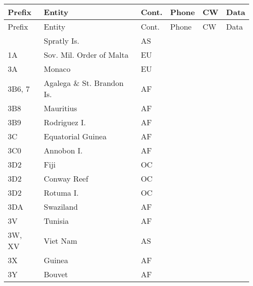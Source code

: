 \documentclass[a4paper]{article}
\begin{document}
\rhead{\call}

\renewcommand\arraystretch{2}
\raggedright
\begin{longtable}{|p{1.5cm}|p{4cm}|l|p{2cm}|p{2cm}|p{2cm}|}
\hline
Prefix & Entity & Cont. & Phone & CW & Data \\
\hline
\hline
\endfirsthead
\hline
Prefix & Entity & Cont. & Phone & CW & Data \\
\hline
\hline
\endhead
\hline
\endfoot
\hline
\endlastfoot
                       & Spratly Is.                                & AS    & & & \\
\hline
1A                     & Sov. Mil. Order of Malta                   & EU    & & & \\
\hline
3A                     & Monaco                                     & EU    & & & \\
\hline
3B6, 7                 & Agalega \& St. Brandon Is.                 & AF    & & & \\
\hline
3B8                    & Mauritius                                  & AF    & & & \\
\hline
3B9                    & Rodriguez I.                               & AF    & & & \\
\hline
3C                     & Equatorial Guinea                          & AF    & & & \\
\hline
3C0                    & Annobon I.                                 & AF    & & & \\
\hline
3D2                    & Fiji                                       & OC    & & & \\
\hline
3D2                    & Conway Reef                                & OC    & & & \\
\hline
3D2                    & Rotuma I.                                  & OC    & & & \\
\hline
3DA                    & Swaziland                                  & AF    & & & \\
\hline
3V                     & Tunisia                                    & AF    & & & \\
\hline
3W, XV                 & Viet Nam                                   & AS    & & & \\
\hline
3X                     & Guinea                                     & AF    & & & \\
\hline
3Y                     & Bouvet                                     & AF    & & & \\

\end{longtable}
\end{document}
